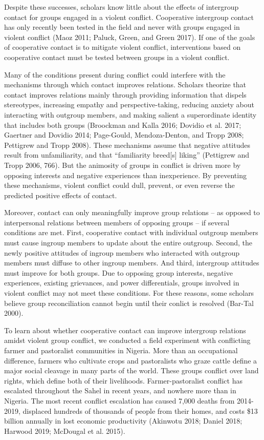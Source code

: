 \documentclass[11pt]{article}
\begin{document}
Despite these successes, scholars know little about the effects of
intergroup contact for groups engaged in a violent conflict. Cooperative
intergroup contact has only recently been tested in the field and never
with groups engaged in violent conflict (Maoz 2011; Paluck, Green, and
Green 2017). If one of the goals of cooperative contact is to mitigate
violent conflict, interventions based on cooperative contact must be
tested between groups in a violent conflict.

Many of the conditions present during conflict could interfere with the
mechanisms through which contact improves relations. Scholars theorize
that contact improves relations mainly through providing information
that dispels stereotypes, increasing empathy and perspective-taking,
reducing anxiety about interacting with outgroup members, and making
salient a superordinate identity that includes both groups (Broockman
and Kalla 2016; Dovidio et al. 2017; Gaertner and Dovidio 2014;
Page-Gould, Mendoza-Denton, and Tropp 2008; Pettigrew and Tropp 2008).
These mechanisms assume that negative attitudes result from
unfamiliarity, and that ``familiarity breed{[}s{]} liking'' (Pettigrew
and Tropp 2006, 766). But the animosity of groups in conflict is driven
more by opposing interests and negative experiences than inexperience.
By preventing these mechanisms, violent conflict could dull, prevent, or
even reverse the predicted positive effects of contact.

Moreover, contact can only meaningfully improve group relations -- as
opposed to interpersonal relations between members of opposing groups --
if several conditions are met. First, cooperative contact with
individual outgroup members must cause ingroup members to update about
the entire outgroup. Second, the newly positive attitudes of ingroup
members who interacted with outgroup members must diffuse to other
ingroup members. And third, intergroup attitudes must improve for both
groups. Due to opposing group interests, negative experiences, existing
grievances, and power differentials, groups involved in violent conflict
may not meet these conditions. For these reasons, some scholars believe
group reconciliation cannot begin until their conlict is resolved
(Bar-Tal 2000).

To learn about whether cooperative contact can improve intergroup
relations amidst violent group conflict, we conducted a field experiment
with conflicting farmer and pastoralist communities in Nigeria. More
than an occupational difference, farmers who cultivate crops and
pastoralists who graze cattle define a major social cleavage in many
parts of the world. These groups conflict over land rights, which define
both of their livelihoods. Farmer-pastoralist conflict has escalated
throughout the Sahel in recent years, and nowhere more than in Nigeria.
The most recent conflict escalation has caused 7,000 deaths from
2014-2019, displaced hundreds of thousands of people from their homes,
and costs \$13 billion annually in lost economic productivity (Akinwotu
2018; Daniel 2018; Harwood 2019; McDougal et al. 2015).
\end{document}

